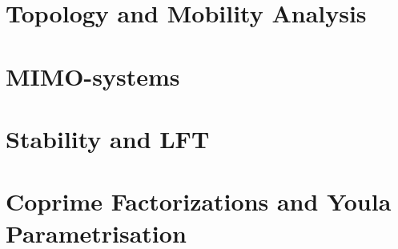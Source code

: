 \documentclass{scrreprt}
\subtitle{Coursework}
\begin{document}
\maketitle

\tableofcontents 

\cleardoublepage

\pagestyle{plain}


\chapter{Topology and Mobility Analysis}

\chapter{MIMO-systems}
\chapter{Stability and LFT}
\chapter{Coprime Factorizations and Youla Parametrisation}



\end{document}
